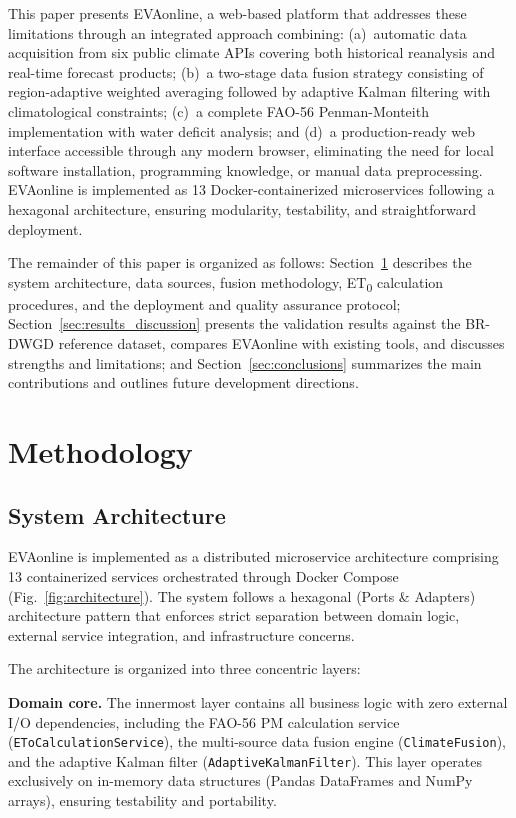 \documentclass[preprint,review,12pt]{elsarticle}
\begin{document}
This paper presents EVAonline, a web-based platform that addresses these
limitations through an integrated approach combining: (a)~automatic data
acquisition from six public climate APIs covering both historical reanalysis
and real-time forecast products; (b)~a two-stage data fusion strategy
consisting of region-adaptive weighted averaging followed by adaptive Kalman
filtering with climatological constraints; (c)~a complete FAO-56
Penman-Monteith implementation with water deficit analysis; and (d)~a
production-ready web interface accessible through any modern browser,
eliminating the need for local software installation, programming knowledge,
or manual data preprocessing. EVAonline is implemented as 13 Docker-containerized
microservices following a hexagonal architecture, ensuring modularity, testability,
and straightforward deployment.

The remainder of this paper is organized as follows:
Section~\ref{sec:methodology} describes the system architecture, data sources,
fusion methodology, ET\textsubscript{0} calculation procedures, and the
deployment and quality assurance protocol;
Section~\ref{sec:results_discussion} presents the validation results against
the BR-DWGD reference dataset, compares EVAonline with existing tools, and
discusses strengths and limitations; and Section~\ref{sec:conclusions}
summarizes the main contributions and outlines future development directions.


\section{Methodology}
\label{sec:methodology}

\subsection{System Architecture}
\label{subsec:architecture}

EVAonline is implemented as a distributed microservice architecture comprising
13 containerized services orchestrated through Docker Compose
(Fig.~\ref{fig:architecture}). The system follows a hexagonal (Ports \&
Adapters) architecture pattern \citep{Cockburn2005} that enforces strict
separation between domain logic, external service integration, and
infrastructure concerns.

The architecture is organized into three concentric layers:

\textbf{Domain core.} The innermost layer contains all business logic with zero
external I/O dependencies, including the FAO-56 PM calculation service
(\texttt{EToCalculationService}), the multi-source data fusion engine
(\texttt{ClimateFusion}), and the adaptive Kalman filter
(\texttt{AdaptiveKalmanFilter}). This layer operates exclusively on in-memory
data structures (Pandas DataFrames and NumPy arrays), ensuring testability and
portability.
\end{document}
